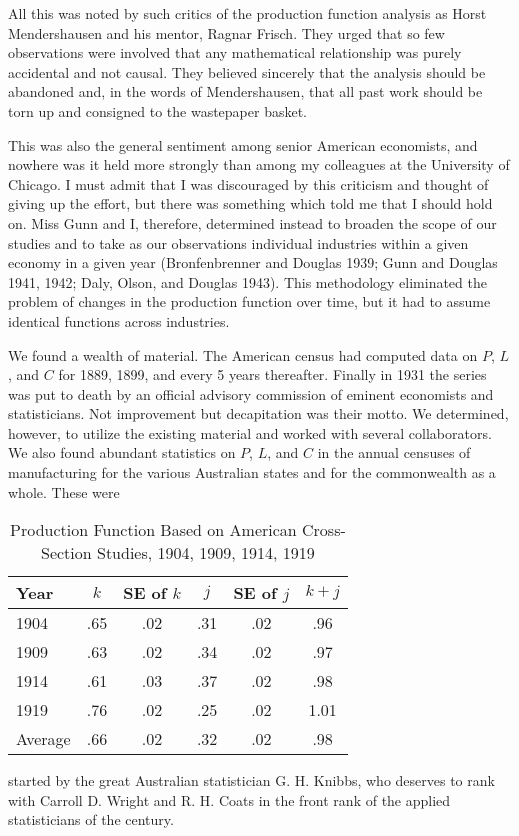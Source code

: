 \documentclass{article}
\begin{document}
All this was noted by such critics of the production function analysis as Horst Mendershausen and his mentor, Ragnar Frisch. They urged that so few observations were involved that any mathematical relationship was purely accidental and not causal. They believed sincerely that the analysis should be abandoned and, in the words of Mendershausen, that all past work should be torn up and consigned to the wastepaper basket.

This was also the general sentiment among senior American economists, and nowhere was it held more strongly than among my colleagues at the University of Chicago. I must admit that I was discouraged by this criticism and thought of giving up the effort, but there was something which told me that I should hold on. Miss Gunn and I, therefore, determined instead to broaden the scope of our studies and to take as our observations individual industries within a given economy in a given year (Bronfenbrenner and Douglas 1939; Gunn and Douglas 1941, 1942; Daly, Olson, and Douglas 1943). This methodology eliminated the problem of changes in the production function over time, but it had to assume identical functions across industries.

We found a wealth of material. The American census had computed data on \(P\), \(L\), and \(C\) for 1889, 1899, and every 5 years thereafter. Finally in 1931 the series was put to death by an official advisory commission of eminent economists and statisticians. Not improvement but decapitation was their motto. We determined, however, to utilize the existing material and worked with several collaborators. We also found abundant statistics on \(P\), \(L\), and \(C\) in the annual censuses of manufacturing for the various Australian states and for the commonwealth as a whole. These were %
\begin{table}[!t]
\centering
\footnotesize{
\caption{Production Function Based on American Cross-Section Studies, 1904, 1909, 1914, 1919}%
\label{tab1}%
\begin{tabular}{l|c|c|c|c|c}
\hline
\hline
Year & \(k\) & SE of \(k\) & \(j\) & SE of \(j\) & \(k + j\) \\
\hline
1904 & .65 & .02 & .31 & .02 & .96 \\
1909 & .63 & .02 & .34 & .02 & .97 \\
1914 & .61 & .03 & .37 & .02 & .98 \\
1919 & .76 & .02 & .25 & .02 & 1.01 \\
Average & .66 & .02 & .32 & .02 & .98 \\
\hline

\end{tabular}
}
\end{table}
started by the great Australian statistician G. H. Knibbs, who deserves to rank with Carroll D. Wright and R. H. Coats in the front rank of the applied statisticians of the century.
\end{document}
